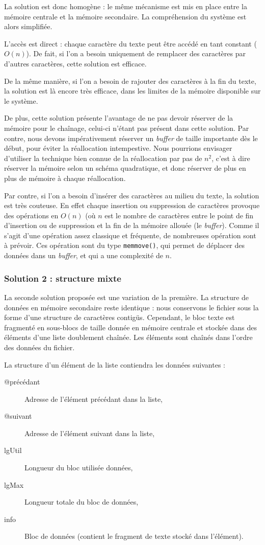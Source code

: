 La solution est donc homogène : le même mécanisme est mis en place entre la
mémoire centrale et la mémoire secondaire. La compréhension du système est
alors simplifiée.

L'accès est direct : chaque caractère du texte peut être accédé en tant
constant ($O(n)$). De fait, si l'on a besoin uniquement de remplacer des
caractères par d'autres caractères, cette solution est efficace.

De la même manière, si l'on a besoin de rajouter des caractères à la fin du
texte, la solution est là encore très efficace, dans les limites de la mémoire
disponible sur le système.

De plus, cette solution présente l'avantage de ne pas devoir réserver de la
mémoire pour le chaînage, celui-ci n'étant pas présent dans cette solution.
Par contre, nous devons impérativement réserver un \emph{buffer} de taille
importante dès le début, pour éviter la réallocation intempestive. Nous
pourrions envisager d'utiliser la technique bien connue de la réallocation par
pas de $n^2$, c'est à dire réserver la mémoire selon un schéma quadratique, et
donc réserver de plus en plus de mémoire à chaque réallocation.

Par contre, si l'on a besoin d'insérer des caractères au milieu du texte, la
solution est très couteuse. En effet chaque insertion ou suppression de
caractères provoque des opérations en $O(n)$ (où $n$ est le nombre de
caractères entre le point de fin d'insertion ou de suppression et la fin de la
mémoire allouée (le \emph{buffer}). Comme il s'agit d'une opération assez
classique et fréquente, de nombreuses opération sont à prévoir.  Ces opération
sont du type \texttt{memmove()}, qui permet de déplacer des données dans un
\emph{buffer}, et qui a une complexité de $n$.

\subsubsection{Solution 2 : structure mixte}
La seconde solution proposée est une variation de la première. La structure de
données en mémoire secondaire reste identique : nous conservons le fichier sous
la forme d'une structure de caractères contigüs. Cependant, le bloc texte est
fragmenté en sous-blocs de taille donnée en mémoire centrale et stockée dans
des éléments d'une liste doublement chaînée. Les éléments sont chaînés dans
l'ordre des données du fichier.

La structure d'un élément de la liste contiendra les données suivantes :
\begin{description}
  \item[@précédant] Adresse de l'élément précédant dans la liste,
  \item[@suivant] Adresse de l'élément suivant dans la liste,
  \item[lgUtil] Longueur du bloc utilisée données,
  \item[lgMax] Longueur totale du bloc de données,
  \item[info] Bloc de données (contient le fragment de texte stocké dans
l'élément).
\end{description}

